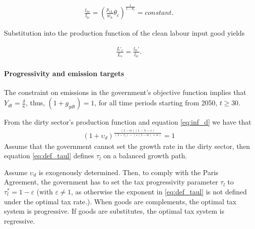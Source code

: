 \begin{align*}
	\frac{l_{hc}}{l_{lc}}=\left(\frac{p_{cL}}{w_h}\theta_c\right)^{\frac{1}{1-\theta_c}}= constant.
\end{align*}

Substitution into the production function of the clean labour input good yields

\begin{align*}
\frac{L'_c}{L_c}=\frac{l_{lc}'}{l_{lc}}.
\end{align*}


\textbf{}

\paragraph{Progressivity and emission targets}
The constraint on emissions in the government's objective function implies that $Y_{dt}=\frac{\delta}{\kappa}$, thus, $(1+g_{ydt})=1$, for all time periods starting from 2050, $t\geq 30$. 

From the dirty sector's production function and equation \ref{eq:inf_d} we have that
\begin{align}\label{eq:def_taul}
(1+\upsilon_{d})^{\frac{(1-\alpha)(1-\tau_l-\varepsilon)}{(1-\tau_l)-(\varepsilon(1-\alpha)+\alpha)}}=1
\end{align}
Assume that the government cannot set the growth rate in the dirty sector, then equation \ref{eq:def_taul} defines $\tau_l$ on a balanced growth path.

\begin{prop}
Assume $\upsilon_{d}$ is exogenously determined. 
Then, to comply with the Paris Agreement, the government has to set the tax progressivity parameter $\tau_l$ to $\tau^*_l=1-\varepsilon$ (with $\varepsilon\neq 1$, as otherwise the exponent in \ref{eq:def_taul} is not defined under the optimal tax rate.).
When goods are complements, the optimal tax system is progressive. If goods are substitutes, the optimal tax system is regressive.
\end{prop}